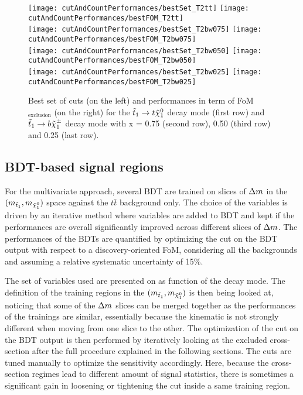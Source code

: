     \begin{figure}[h!]
        \centering
        \texttt{[image: cutAndCountPerformances/bestSet\_T2tt]}
        \texttt{[image: cutAndCountPerformances/bestFOM\_T2tt]}\\
        \texttt{[image: cutAndCountPerformances/bestSet\_T2bw075]}
        \texttt{[image: cutAndCountPerformances/bestFOM\_T2bw075]}\\
        \texttt{[image: cutAndCountPerformances/bestSet\_T2bw050]}
        \texttt{[image: cutAndCountPerformances/bestFOM\_T2bw050]}\\
        \texttt{[image: cutAndCountPerformances/bestSet\_T2bw025]}
        \texttt{[image: cutAndCountPerformances/bestFOM\_T2bw025]}
        \caption{Best set of cuts (on the left) and performances in term of
        FoM$_\text{exclusion}$ (on the right) for the $\tilde{t}_1 \rightarrow t
        \tilde{\chi}_1^0$ decay mode (first row) and $\tilde{t}_1 \rightarrow b \tilde{\chi}_1^\pm$
        decay mode with x = 0.75 (second row), 0.50 (third row) and 0.25 (last row).}
        \label{fig:cutAndCountPerformances}
    \end{figure}

        \subsection{BDT-based signal regions}

    For the multivariate approach, several BDT are trained on slices of $\Delta m$ in the
    $(m_{\tilde{t}_1},m_{\tilde{\chi}_1^0})$ space against the $t\bar{t}$ background only.
    The choice of the variables is driven by an iterative method where variables are added
    to BDT and kept if the performances are overall significantly improved across different
    slices of $\Delta m$. The performances of the BDTs are quantified by optimizing the cut
    on the BDT output with respect to a discovery-oriented FoM, considering all the
    backgrounds and assuming a relative systematic uncertainty of 15\%.

    The set of variables used are presented on  as function
    of the decay mode. The definition of the training regions in the
    $(m_{\tilde{t}_1},m_{\tilde{\chi}_1^0})$ is then being looked at, noticing that some of
    the $\Delta m$ slices can be merged together as the performances of the trainings are
    similar, essentially because the kinematic is not strongly different when moving from
    one slice to the other. The optimization of the cut on the BDT output is then performed
    by iteratively looking at the excluded cross-section after the full procedure explained
    in the following sections. The cuts are tuned manually to optimize the sensitivity
    accordingly. Here, because the cross-section regimes lead to different amount of signal
    statistics, there is sometimes a significant gain in loosening or tightening the cut
    inside a same training region.

